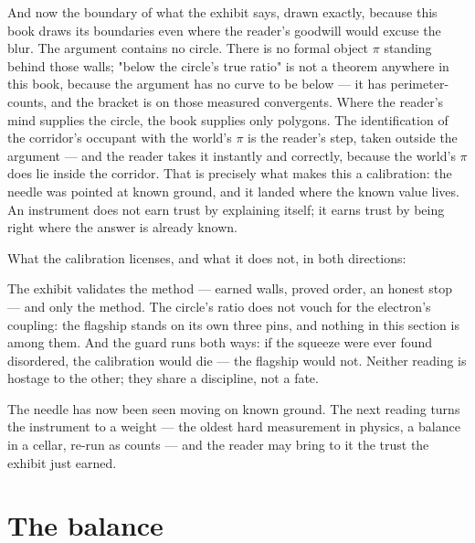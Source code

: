 And now the boundary of what the exhibit says, drawn exactly, because this book
draws its boundaries even where the reader's goodwill would excuse the blur. The
argument contains no circle. There is no formal object $\pi$ standing behind those
walls; "below the circle's true ratio" is not a theorem anywhere in this book,
because the argument has no curve to be below --- it has perimeter-counts, and the
bracket is on those measured convergents. Where the reader's mind supplies the
circle, the book supplies only polygons. The identification of the corridor's
occupant with the world's $\pi$ is the reader's step, taken outside the argument
--- and the reader takes it instantly and correctly, because the world's $\pi$
does lie inside the corridor. That is precisely what makes this a calibration: the
needle was pointed at known ground, and it landed where the known value lives. An
instrument does not earn trust by explaining itself; it earns trust by being
right where the answer is already known.

What the calibration licenses, and what it does not, in both directions:

\begin{fence}
The exhibit validates the method --- earned walls, proved order, an honest stop
--- and only the method. The circle's ratio does not vouch for the electron's
coupling: the flagship stands on its own three pins, and nothing in this section
is among them. And the guard runs both ways: if the squeeze were ever found
disordered, the calibration would die --- the flagship would not. Neither reading
is hostage to the other; they share a discipline, not a fate.
\end{fence}

The needle has now been seen moving on known ground. The next reading turns the
instrument to a weight --- the oldest hard measurement in physics, a balance in a
cellar, re-run as counts --- and the reader may bring to it the trust the exhibit
just earned.

\section{The balance}

